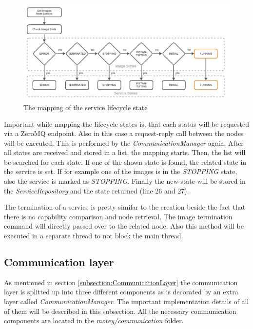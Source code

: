 \begin{figure}[H]
    \centering
    \includegraphics[width=\textwidth]{resources/images/lifecycle_state.png}
    \caption[The mapping of the service lifecycle state]{The mapping of the service lifecycle state}
    \label{fig:lifecycle_mapping}
\end{figure}

Important while mapping the lifecycle states is, that each status will be requested via a ZeroMQ endpoint.
Also in this case a request-reply call between the nodes will be executed.
This is performed by the \textit{CommunicationManager} again.
After all states are received and stored in a list, the mapping starts.
Then, the list will be searched for each state.
If one of the shown state is found, the related state in the service is set.
If for example one of the images is in the \textit{STOPPING} state, also the service is marked as \textit{STOPPING}.
Finally the new state will be stored in the \textit{ServiceRepository} and the state returned (line 26 and 27).\newline

The termination of a service is pretty similar to the creation beside the fact that there is no capability comparison and node retrieval.
The image termination command will directly passed over to the related node.
Also this method will be executed in a separate thread to not block the main thread.

\subsection{Communication layer}
\label{subsection:implementation-communication-layer}
As mentioned in section \ref{subsection:CommunicationLayer} the communication layer is splitted up into three different components as is decorated by an extra layer called \textit{CommunicationManager}.
The important implementation details of all of them will be described in this subsection.
All the necessary communication components are located in the \textit{motey/communication} folder.

